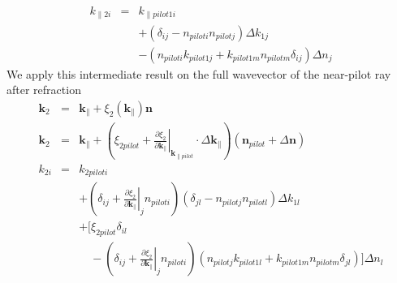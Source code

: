 \documentclass[12pt,a4paper,twoside,openright,BCOR10mm,headsepline,titlepage,abstracton,chapterprefix,final]{scrreprt}
\newcommand\Vector[1]{{\mathbf{#1}}}
\newcommand\wavenumber{k}
\newcommand\Wavevector{\Vector{\wavenumber}}
\begin{document}
\begin{eqnarray}
 \wavenumber_{\parallel2i}
 &=& 
 \wavenumber_{\parallel pilot1i} \nonumber\\
 &&+ ( \delta_{ij} -  n_{piloti} n_{pilotj} ) \Delta \wavenumber_{1j} \nonumber\\
 &&- ( n_{piloti} \wavenumber_{pilot1j} + \wavenumber_{pilot1m}   n_{pilotm} \delta_{ij}) \Delta n_j
\end{eqnarray}
We apply this intermediate result on the full wavevector of the near-pilot ray after refraction
\begin{eqnarray}
 \Wavevector_2 &=& \Wavevector_{\parallel} + \xi_2(\Wavevector_{\parallel}) \Vector{n} \\
 \Wavevector_2 &=& \Wavevector_{\parallel}
                 + \left(
                     \xi_{2 pilot} +
                     \left. \frac{\partial \xi_2}{\partial \Wavevector_{\parallel}} \right|_{\Wavevector_{\parallel pilot}}
                     \cdot \Delta \Wavevector_{\parallel}
                   \right)
                   \left(
                     \Vector{n}_{pilot} + \Delta \Vector{n} 
                   \right)
 \\ 
 \wavenumber_{2i}
 &=& 
 \wavenumber_{2pilot i} \nonumber \\
 &&+ \left( 
       \delta_{ij}
       + \left. \frac{\partial \xi_2}{\partial \Wavevector_{\parallel}} \right|_j n_{pilot i}
     \right) 
     ( \delta_{jl} -  n_{pilot j} n_{pilot l} ) \Delta \wavenumber_{1l} \nonumber\\
 &&+ \Bigg[
     \xi_{2 pilot} \delta_{il} \nonumber\\
 &&\quad- 
     \left( 
       \delta_{ij}
       + \left. \frac{\partial \xi_2}{\partial \Wavevector_{\parallel}} \right|_j n_{pilot i}
     \right) 
     ( n_{pilot j} \wavenumber_{pilot1 l} + \wavenumber_{pilot1 m}   n_{pilot m} \delta_{jl}) 
   \Bigg] \Delta n_l
\end{eqnarray}
\end{document}
